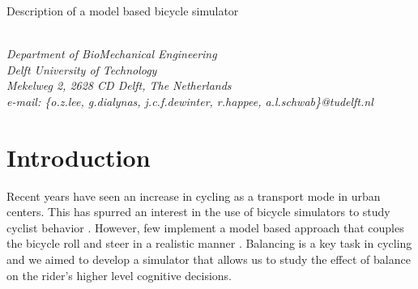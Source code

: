 \documentclass{icsc2017a}
\begin{document}
\begin{flushleft}
{\fontsize{16pt}{20pt}\selectfont
    Description of a model based bicycle simulator}
\end{flushleft}
\begin{flushleft}
  {\\}
  \textit{Department of BioMechanical Engineering\\
    Delft University of Technology\\
    Mekelweg 2, 2628 CD Delft, The Netherlands\\
    e-mail: \{o.z.lee, g.dialynas, j.c.f.dewinter, r.happee, a.l.schwab\}@tudelft.nl}
\end{flushleft}
\section{Introduction}
Recent years have seen an increase in cycling as a transport mode in urban centers.
This has spurred an interest in the use of bicycle simulators to study cyclist behavior \cite{caro2015role,
herpers2008fivis, ohern2017validation, plumert2004childrens}.
However, few implement a model based approach that couples the bicycle roll and steer in a
realistic manner \cite{yin2007implementation}.
Balancing is a key task in cycling and we aimed to develop a simulator that allows us to study the effect of balance on
the rider's higher level cognitive decisions.
\end{document}
